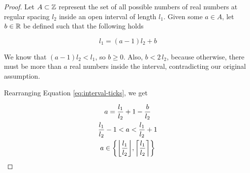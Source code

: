 \begin{proof}
	Let $A \subset \mathbb Z$ represent the set of all possible numbers of real numbers at regular spacing $l_2$ inside an open interval of length $l_1$. Given some $a \in A$, let $b \in \mathbb R$ be defined such that the following holds

	\begin{equation}\label{eq:interval-ticks}
		l_1 = (a - 1) l_2 + b
	\end{equation}

	We know that $(a - 1) l_2 < l_1$, so $b \ge 0$. Also, $b < 2 \, l_2$, because otherwise, there must be more than $a$ real numbers inside the interval, contradicting our original assumption.

	Rearranging Equation \ref{eq:interval-ticks}, we get

	\begin{gather}
		a = \frac{l_1}{l_2} + 1 - \frac{b}{l_2}\\
		\frac{l_1}{l_2} - 1 < a < \frac{l_1}{l_2} + 1\\
		a \in \cbracket{\floor{\frac{l_1}{l_2}}, \ceil{\frac{l_1}{l_2}}}
	\end{gather}
\end{proof}
